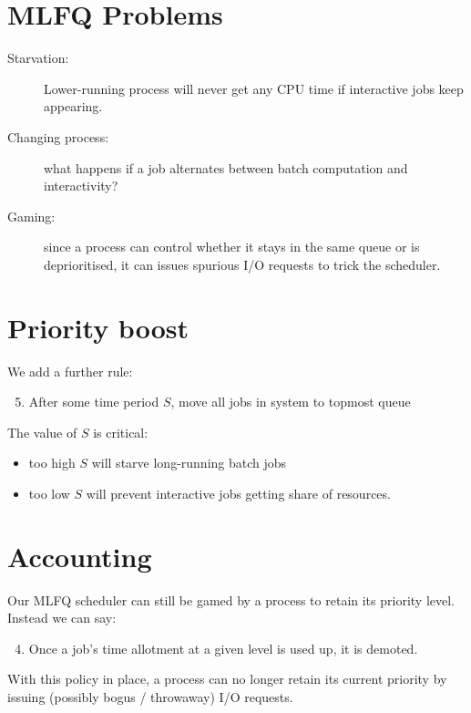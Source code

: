 \section{MLFQ Problems}
\label{sec:mlfq-problems}

\begin{description}
\item[Starvation:] Lower-running process will never get any CPU time if interactive jobs keep appearing.
\item[Changing process:] what happens if a job alternates between batch computation and interactivity?
\item[Gaming:] since a process can control whether it stays in the same queue or is deprioritised, it can issues spurious I/O requests to trick the scheduler.
\end{description}

\section{Priority boost}

We add a further rule: 

\begin{enumerate}
  \setcounter{enumi}{4}
\item After some time period $S$, move all jobs in system to topmost queue \label{item:mlfq-rule:priority-boost}
\end{enumerate}

The value of $S$ is critical:
\begin{itemize}
\item too high $S$ will starve long-running batch jobs
\item too low $S$ will prevent interactive jobs getting share of resources.
\end{itemize}

\section{Accounting}

Our MLFQ scheduler can still be gamed by a process to retain its priority level.
Instead we can say:
\begin{enumerate}
  \setcounter{enumi}{3}
\item Once a job's time allotment at a given level is used up, it is demoted.
\end{enumerate}
With this policy in place, a process can no longer retain its current priority by issuing (possibly bogus / throwaway) I/O requests.

